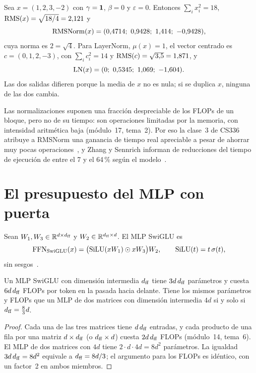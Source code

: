\begin{ejemplo}\label{ej:rmsnorm}
Sea $x=(1,2,3,-2)$ con $\gamma=\mathbf{1}$, $\beta=0$ y $\varepsilon=0$. Entonces $\sum_i x_i^{2}=18$, $\operatorname{RMS}(x)=\sqrt{18/4}=2{,}121$ y
\[
\RMSNorm(x)=(0{,}4714;\ 0{,}9428;\ 1{,}414;\ -0{,}9428),
\]
cuya norma es $2=\sqrt 4$. Para LayerNorm, $\mu(x)=1$, el vector centrado es $c=(0,1,2,-3)$, con $\sum_i c_i^{2}=14$ y $\operatorname{RMS}(c)=\sqrt{3{,}5}=1{,}871$, y
\[
\LN(x)=(0;\ 0{,}5345;\ 1{,}069;\ -1{,}604).
\]
Las dos salidas difieren porque la media de $x$ no es nula; si se duplica $x$, ninguna de las dos cambia.
\end{ejemplo}

\begin{observacion}[Coste]
Las normalizaciones suponen una fracción despreciable de los FLOPs de un bloque, pero no de su tiempo: son operaciones limitadas por la memoria, con intensidad aritmética baja (módulo~17, tema~2). Por eso la clase~3 de CS336 atribuye a RMSNorm una ganancia de tiempo real apreciable a pesar de ahorrar muy pocas operaciones~\cite{cs336}, y Zhang y Sennrich informan de reducciones del tiempo de ejecución de entre el 7 y el 64\,\% según el modelo~\cite{rmsnorm}.
\end{observacion}

\section{El presupuesto del MLP con puerta}

\begin{definicion}\label{def:swiglu}
Sean $W_1,W_3\in\mathbb{R}^{d\times d_{\mathrm{ff}}}$ y $W_2\in\mathbb{R}^{d_{\mathrm{ff}}\times d}$. El MLP SwiGLU es
\[
\operatorname{FFN}_{\operatorname{SwiGLU}}(x)=\bigl(\operatorname{SiLU}(xW_1)\odot xW_3\bigr)W_2,\qquad \operatorname{SiLU}(t)=t\,\sigma(t),
\]
sin sesgos~\cite[ec.~6]{shazeerglu}.
\end{definicion}

\begin{proposicion}\label{prop:presupuesto}
Un MLP SwiGLU con dimensión intermedia $d_{\mathrm{ff}}$ tiene $3d\,d_{\mathrm{ff}}$ parámetros y cuesta $6d\,d_{\mathrm{ff}}$ FLOPs por token en la pasada hacia delante. Tiene los mismos parámetros y FLOPs que un MLP de dos matrices con dimensión intermedia $4d$ si y solo si $d_{\mathrm{ff}}=\frac83 d$.
\end{proposicion}

\begin{proof}
Cada una de las tres matrices tiene $d\,d_{\mathrm{ff}}$ entradas, y cada producto de una fila por una matriz $d\times d_{\mathrm{ff}}$ (o $d_{\mathrm{ff}}\times d$) cuesta $2d\,d_{\mathrm{ff}}$ FLOPs (módulo~14, tema~6). El MLP de dos matrices con $4d$ tiene $2\cdot d\cdot 4d=8d^{2}$ parámetros. La igualdad $3d\,d_{\mathrm{ff}}=8d^{2}$ equivale a $d_{\mathrm{ff}}=8d/3$; el argumento para los FLOPs es idéntico, con un factor~2 en ambos miembros.
\end{proof}

